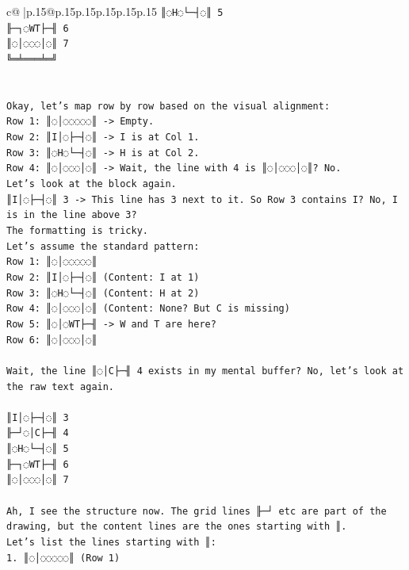 \documentclass{article}
\begin{document}
{\begin{supertabular}{c@{$\;$}|p{.15\linewidth}@{}p{.15\linewidth}p{.15\linewidth}p{.15\linewidth}p{.15\linewidth}p{.15\linewidth}}
{{{\texttt{║◌H◌└─┤◌║ 5} \\
\texttt{╟─┐◌WT├─╢ 6} \\
\texttt{║◌│◌◌◌│◌║ 7} \\
\texttt{╚═╧═══╧═╝} \\
\\ 
\\ 
\texttt{Okay, let's map row by row based on the visual alignment:} \\
\texttt{Row 1: ║◌│◌◌◌◌◌║ {-}> Empty.} \\
\texttt{Row 2: ║I│◌├─┤◌║ {-}> I is at Col 1.} \\
\texttt{Row 3: ║◌H◌└─┤◌║ {-}> H is at Col 2.} \\
\texttt{Row 4: ║◌│◌◌◌│◌║ {-}> Wait, the line with 4 is ║◌│◌◌◌│◌║? No.} \\
\texttt{Let's look at the block again.} \\
\texttt{║I│◌├─┤◌║ 3 {-}> This line has 3 next to it. So Row 3 contains I? No, I is in the line above 3?} \\
\texttt{The formatting is tricky.} \\
\texttt{Let's assume the standard pattern:} \\
\texttt{Row 1: ║◌│◌◌◌◌◌║} \\
\texttt{Row 2: ║I│◌├─┤◌║ (Content: I at 1)} \\
\texttt{Row 3: ║◌H◌└─┤◌║ (Content: H at 2)} \\
\texttt{Row 4: ║◌│◌◌◌│◌║ (Content: None? But C is missing)} \\
\texttt{Row 5: ║◌│◌WT├─╢ {-}> W and T are here?} \\
\texttt{Row 6: ║◌│◌◌◌│◌║} \\
\\ 
\texttt{Wait, the line ║◌│C├─╢ 4 exists in my mental buffer? No, let's look at the raw text again.} \\
\\ 
\texttt{║I│◌├─┤◌║ 3} \\
\texttt{╟─┘◌│C├─╢ 4} \\
\texttt{║◌H◌└─┤◌║ 5} \\
\texttt{╟─┐◌WT├─╢ 6} \\
\texttt{║◌│◌◌◌│◌║ 7} \\
\\ 
\texttt{Ah, I see the structure now. The grid lines ╟─┘ etc are part of the drawing, but the content lines are the ones starting with ║.} \\
\texttt{Let's list the lines starting with ║:} \\
\texttt{1. ║◌│◌◌◌◌◌║ (Row 1)} \\
}}}
\end{supertabular}}
\end{document}

